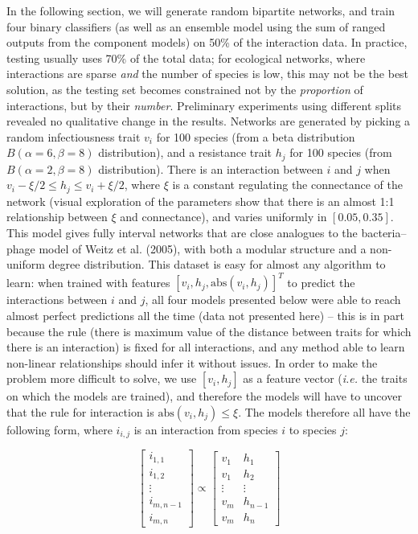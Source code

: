 \documentclass[11pt]{article}
\begin{document}
In the following section, we will generate random bipartite networks,
and train four binary classifiers (as well as an ensemble model using
the sum of ranged outputs from the component models) on 50\% of the
interaction data. In practice, testing usually uses 70\% of the total
data; for ecological networks, where interactions are sparse \emph{and}
the number of species is low, this may not be the best solution, as the
testing set becomes constrained not by the \emph{proportion} of
interactions, but by their \emph{number}. Preliminary experiments using
different splits revealed no qualitative change in the results. Networks
are generated by picking a random infectiousness trait \(v_i\) for 100
species (from a beta distribution \(B(\alpha=6,\beta=8)\) distribution),
and a resistance trait \(h_j\) for 100 species (from
\(B(\alpha=2,\beta=8)\) distribution). There is an interaction between
\(i\) and \(j\) when \(v_i-\xi/2 \le h_j \le v_i+\xi/2\), where \(\xi\)
is a constant regulating the connectance of the network (visual
exploration of the parameters show that there is an almost 1:1
relationship between \(\xi\) and connectance), and varies uniformly in
\([0.05, 0.35]\). This model gives fully interval networks that are
close analogues to the bacteria--phage model of Weitz et al. (2005),
with both a modular structure and a non-uniform degree distribution.
This dataset is easy for almost any algorithm to learn: when trained
with features \([v_i, h_j, \text{abs}(v_i, h_j)] ^T\) to predict the
interactions between \(i\) and \(j\), all four models presented below
were able to reach almost perfect predictions all the time (data not
presented here) -- this is in part because the rule (there is maximum
value of the distance between traits for which there is an interaction)
is fixed for all interactions, and any method able to learn non-linear
relationships should infer it without issues. In order to make the
problem more difficult to solve, we use \([v_i, h_j]\) as a feature
vector (\emph{i.e.} the traits on which the models are trained), and
therefore the models will have to uncover that the rule for interaction
is \(\text{abs}(v_i, h_j) \le \xi\). The models therefore all have the
following form, where \(i_{i,j}\) is an interaction from species \(i\)
to species \(j\):

\[
\begin{bmatrix}
    i_{1,1} \\
    i_{1,2} \\
    \vdots \\
    i_{m,n-1} \\
    i_{m,n}
\end{bmatrix}
\propto
\begin{bmatrix}
           v_{1} & h_{1} \\
           v_{1} & h_{2} \\
           \vdots & \vdots \\
           v_{m} & h_{n-1} \\
           v_{m} & h_{n}
         \end{bmatrix}
\]
\end{document}
